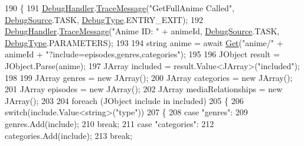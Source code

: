 \begin{DoxyCode}
190         \{
191             \mbox{\hyperlink{class_little_weeb_library_1_1_handlers_1_1_kitsu_handler_a6d3c55fa5eee15320845c2d902c96882}{DebugHandler}}.\mbox{\hyperlink{interface_little_weeb_library_1_1_handlers_1_1_i_debug_handler_a2e405bc3492e683cd3702fae125221bc}{TraceMessage}}(\textcolor{stringliteral}{"GetFullAnime Called"}, 
      \mbox{\hyperlink{namespace_little_weeb_library_1_1_handlers_a2a6ca0775121c9c503d58aa254d292be}{DebugSource}}.TASK, \mbox{\hyperlink{namespace_little_weeb_library_1_1_handlers_ab66019ed40462876ec4e61bb3ccb0a62}{DebugType}}.ENTRY\_EXIT);
192             \mbox{\hyperlink{class_little_weeb_library_1_1_handlers_1_1_kitsu_handler_a6d3c55fa5eee15320845c2d902c96882}{DebugHandler}}.\mbox{\hyperlink{interface_little_weeb_library_1_1_handlers_1_1_i_debug_handler_a2e405bc3492e683cd3702fae125221bc}{TraceMessage}}(\textcolor{stringliteral}{"Anime ID: "} + animeId, 
      \mbox{\hyperlink{namespace_little_weeb_library_1_1_handlers_a2a6ca0775121c9c503d58aa254d292be}{DebugSource}}.TASK, \mbox{\hyperlink{namespace_little_weeb_library_1_1_handlers_ab66019ed40462876ec4e61bb3ccb0a62}{DebugType}}.PARAMETERS);
193 
194             \textcolor{keywordtype}{string} anime = await \mbox{\hyperlink{class_little_weeb_library_1_1_handlers_1_1_kitsu_handler_a8b7c629a03096c3152252f6b5cf2937f}{Get}}(\textcolor{stringliteral}{"anime/"} + animeId + \textcolor{stringliteral}{"?include=episodes,genres,categories"});
195 
196             JObject result = JObject.Parse(anime);
197             JArray included = result.Value<JArray>(\textcolor{stringliteral}{"included"});
198 
199             JArray genres = \textcolor{keyword}{new} JArray();
200             JArray categories = \textcolor{keyword}{new} JArray();
201             JArray episodes = \textcolor{keyword}{new} JArray();
202             JArray mediaRelationships = \textcolor{keyword}{new} JArray();
203 
204             \textcolor{keywordflow}{foreach} (JObject include \textcolor{keywordflow}{in} included)
205             \{
206                 \textcolor{keywordflow}{switch}(include.Value<\textcolor{keywordtype}{string}>(\textcolor{stringliteral}{"type"}))
207                 \{
208                     \textcolor{keywordflow}{case} \textcolor{stringliteral}{"genres"}:
209                         genres.Add(include);
210                         \textcolor{keywordflow}{break};
211                     \textcolor{keywordflow}{case} \textcolor{stringliteral}{"categories"}:
212                         categories.Add(include);
213                         \textcolor{keywordflow}{break};

\end{DoxyCode}
